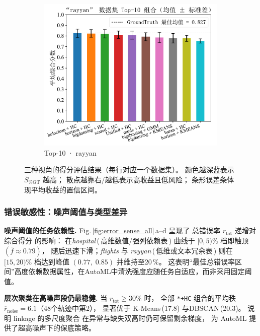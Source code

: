 \documentclass[10pt]{article} %
\numberwithin{equation}{section}
\begin{document}
\begin{figure}[htbp]
\begin{subfigure}{0.34\linewidth}
    \centering
    \includegraphics[width=\linewidth]{figures/5.3.1graph/top10_bar_error_rayyan.pdf}
    \caption{Top-10 · rayyan}
  \end{subfigure}

  \caption{三种视角的得分评估结果（每行对应一个数据集）。%
           颜色越深蓝表示 \(\overline{S}_{\%\mathrm{GT}}\) 越高；%
           散点越靠右/越低表示高收益且低风险；%
           条形误差条体现平均收益的置信区间。
           }
  \label{fig:score_eval_all}
\end{figure}

\subsubsection{错误敏感性：噪声阈值与类型差异}
\label{subsec:error_sensitivity}

\vspace{0.2em}
\noindent%
\textbf{噪声阈值的任务依赖性.}\;
Fig.\,\ref{fig:error_sense_all}\,a–d 呈现了
总错误率 \(r_{\text{tot}}\) 递增对综合得分
的影响：%
在\textit{hospital}\,(\,高维数值/强列依赖表\,)
曲线于 \(\![0,5)\%\) 档即触顶
\((\overline{f}\approx 0.79)\)，
随后迅速下滑；\textit{flights} 与 \textit{rayyan}\,(\,低维或文本冗余表\,)
则在 \(\![15,20)\%\) 档达到峰值
\((0.77,\;0.85)\) 并维持至20 \%。
这表明“最佳总错误率区间”高度依赖数据属性，在AutoML中清洗强度应随任务自适应，而非采用固定阈值。

\medskip
\noindent%
\textbf{层次聚类在高噪声段仍最稳健.}\;
当 \(r_{\text{tot}}\ge 30\%\) 时，
全部 \texttt{*+HC} 组合的平均秩
\(\overline{r}_{\text{noise}}=6.1\)（48个轨迹中第2），
显著优于 K‑Means\,(17.8) 与DBSCAN\,(20.3)。
说明 linkage 的多尺度聚合
在异常与缺失双高时仍可保留剩余梯度，
为 AutoML 提供了超高噪声下的保底策略。
\end{document}

